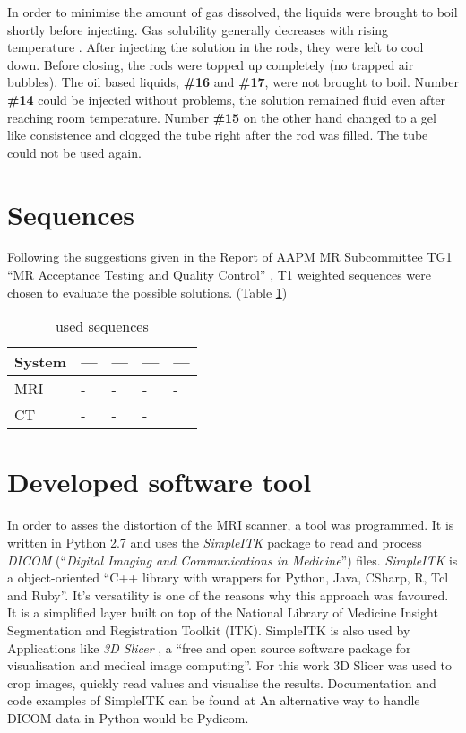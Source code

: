 In order to minimise the amount of gas dissolved, the liquids were brought to boil shortly before injecting. Gas solubility generally decreases with rising temperature \cite{Henry1803, Sander2015}.
After injecting the solution in the rods, they were left to cool down.
Before closing, the rods were topped up completely (no trapped air bubbles).
The oil based liquids, \textbf{\#16} and \textbf{\#17}, were not brought to boil.
Number \textbf{\#14} could be injected without problems, the solution remained fluid even after reaching room temperature.
Number \textbf{\#15} on the other hand changed to a gel like consistence and clogged the tube right after the rod was filled. The tube could not be used again.



\section{Sequences}
Following the suggestions given in the Report of AAPM MR Subcommittee TG1 ``MR Acceptance Testing and
Quality Control'' \cite{Jackson2009}, T1 weighted sequences were chosen to evaluate the possible solutions. (Table \ref{tab:settings})

\begin{table}[h]
\centering
\begin{tabular}{@{}lllll@{}}
System & ---  & --- &  --- & --- \\
\toprule
MRI    & -   & -   & -   & -    \\
CT     & -   & -   & -   &
\end{tabular}
\caption{used sequences}
\label{tab:settings}
\end{table}

\section{Developed software tool}

In order to asses the distortion of the MRI scanner, a tool was programmed.
It is written in Python 2.7 and uses the \textit{SimpleITK} package to read and process \textit{DICOM} (``\textit{Digital Imaging and Communications in Medicine}'') files. \cite{Python, DICOM}
\textit{SimpleITK} is a object-oriented ``C++ library with wrappers for Python, Java, CSharp, R, Tcl and Ruby''. \cite{SimpleITK, SimpleITK_started} It's versatility is one of the reasons why this approach was favoured.
It is a simplified layer built on top of the National Library of Medicine Insight Segmentation and Registration Toolkit (ITK). SimpleITK is also used by Applications like \textit{3D Slicer} , a ``free and open source software package for
visualisation and medical image computing''. \cite{3DSlicer, Kikinis2012} For this work 3D Slicer was used to crop images, quickly read values and visualise the results.
Documentation and code examples of SimpleITK can be found at \cite{InsightSoftwareConsortium, Kyriakou-SimpleITK}
An alternative way to handle DICOM data in Python would be Pydicom. \cite{Pydicom, Kyriakou-Pydicom-VTK} 

